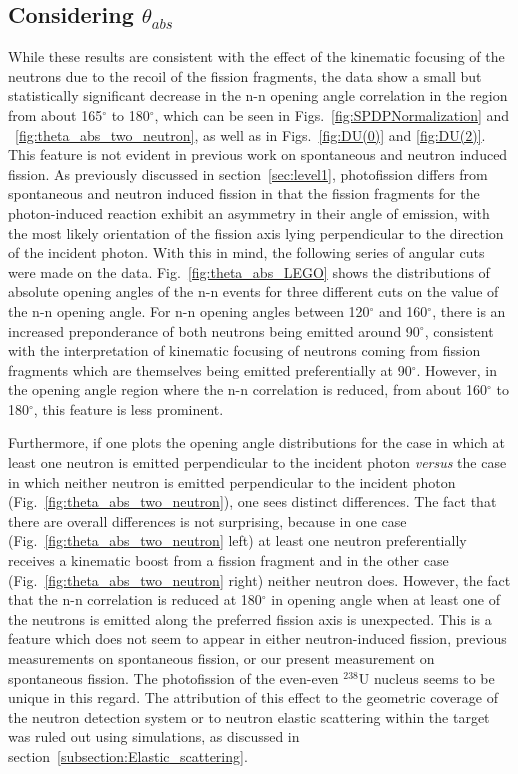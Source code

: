 \documentclass[%
 reprint,
 amsmath,amssymb,
 aps,
 nofootinbib
]{revtex4-1}
\begin{document}
\subsection{Considering $\theta_{abs}$}
\label{sec:anomaly}
While these results are consistent with the effect of the kinematic focusing of the neutrons due to the recoil of the fission fragments, the data show a small but statistically significant decrease in the n-n opening angle correlation in the region from about 165$^{\circ}$ to 180$^{\circ}$, which can be seen in Figs.~\ref{fig:SPDPNormalization} and ~\ref{fig:theta_abs_two_neutron}, as well as in Figs.~\ref{fig:DU(0)} and \ref{fig:DU(2)}.
This feature is not evident in previous work on spontaneous and neutron induced fission.
As previously discussed in section~\ref{sec:level1}, photofission differs from spontaneous and neutron induced fission in that the fission fragments for the photon-induced reaction exhibit an asymmetry in their angle of emission, with the most likely orientation of the fission axis lying perpendicular to the direction of the incident photon.
With this in mind, the following series of angular cuts were made on the data.
Fig.~\ref{fig:theta_abs_LEGO} shows the distributions of absolute opening angles of the n-n events for three different cuts on the value of the n-n opening angle.
For n-n opening angles between 120$^{\circ}$ and 160$^{\circ}$, there is an increased preponderance of both neutrons being emitted around 90$^{\circ}$, consistent with the interpretation of kinematic focusing of neutrons coming from fission fragments which are themselves being emitted preferentially at 90$^{\circ}$.
However, in the opening angle region where the n-n correlation is reduced, from about 160$^{\circ}$ to 180$^{\circ}$, this feature is less prominent.

Furthermore, if one plots the opening angle distributions for the case in which at least one neutron is emitted perpendicular to the incident photon \emph{versus} the case in which neither neutron is emitted perpendicular to the incident photon (Fig.~\ref{fig:theta_abs_two_neutron}), one sees distinct differences.
The fact that there are overall differences is not surprising, because in one case (Fig.~\ref{fig:theta_abs_two_neutron} left) at least one neutron preferentially receives a kinematic boost from a fission fragment and in the other case (Fig.~\ref{fig:theta_abs_two_neutron} right) neither neutron does.
However, the fact that the n-n correlation is reduced at 180$^{\circ}$ in opening angle when at least one of the neutrons is emitted along the preferred fission axis is unexpected.
This is a feature which does not seem to appear in either neutron-induced fission, previous measurements on spontaneous fission, or our present measurement on spontaneous fission.
The photofission of the even-even $^{238}$U nucleus seems to be unique in this regard. 
The attribution of this effect to the geometric coverage of the neutron detection system or to neutron elastic scattering within the target was ruled out using simulations, as discussed in section~\ref{subsection:Elastic_scattering}.
\end{document}
